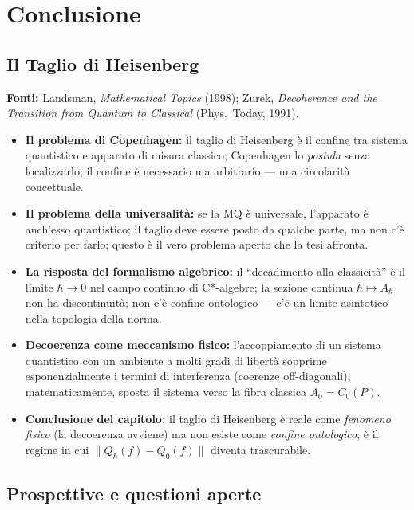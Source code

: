 \documentclass[12pt, a4paper]{article}
\newcommand{\fonti}[1]{%
	\begin{fontebox}
		\textcolor{fontecolor}{\footnotesize\textbf{Fonti:} #1}
	\end{fontebox}%
}
\begin{document}
	\newpage 
	
	\section{Conclusione}
	\subsection{Il Taglio di Heisenberg}
	
	\fonti{Landsman, \textit{Mathematical Topics} (1998); Zurek, \textit{Decoherence and the Transition from Quantum to Classical} (Phys.\ Today, 1991).}
	
	\begin{itemize}
		\item \textbf{Il problema di Copenhagen:} il taglio di Heisenberg è il confine tra sistema quantistico e apparato di misura classico; Copenhagen lo \emph{postula} senza localizzarlo; il confine è necessario ma arbitrario --- una circolarità concettuale.
		\item \textbf{Il problema della universalità:} se la MQ è universale, l'apparato è anch'esso quantistico; il taglio deve essere posto da qualche parte, ma non c'è criterio per farlo; questo è il vero problema aperto che la tesi affronta.
		\item \textbf{La risposta del formalismo algebrico:} il ``decadimento alla classicità'' è il limite $\hbar\to 0$ nel campo continuo di C*-algebre; la sezione continua $\hbar \mapsto A_\hbar$ non ha discontinuità; non c'è confine ontologico --- c'è un limite asintotico nella topologia della norma.
		\item \textbf{Decoerenza come meccanismo fisico:} l'accoppiamento di un sistema quantistico con un ambiente a molti gradi di libertà sopprime esponenzialmente i termini di interferenza (coerenze off-diagonali); matematicamente, sposta il sistema verso la fibra classica $A_0 = C_0(P)$.
		\item \textbf{Conclusione del capitolo:} il taglio di Heisenberg è reale come \emph{fenomeno fisico} (la decoerenza avviene) ma non esiste come \emph{confine ontologico}; è il regime in cui $\|Q_\hbar(f) - Q_0(f)\|$ diventa trascurabile.
	\end{itemize}
	
	\subsection{Prospettive e questioni aperte}
	
\end{document}
